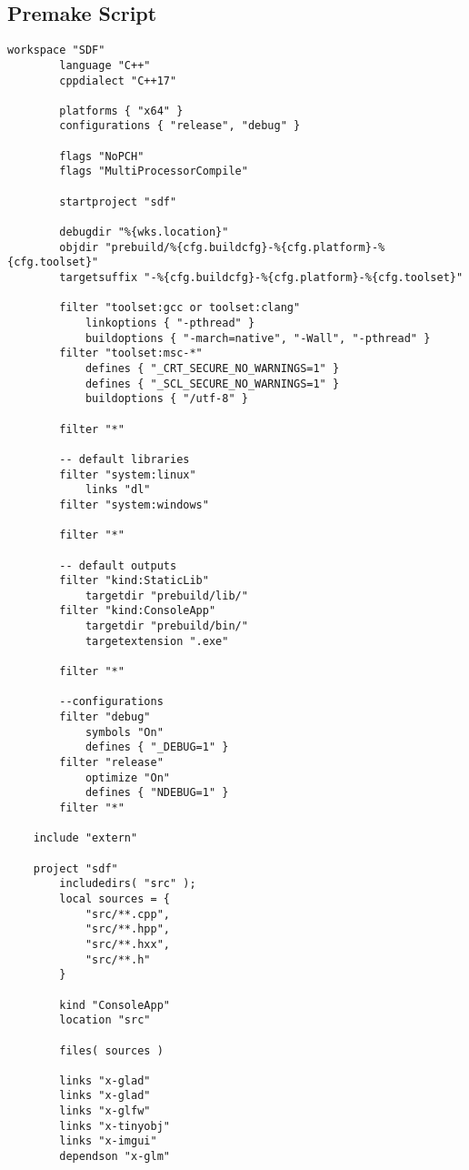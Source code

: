 \begin{appendices}
\chapter{Premake Script}
\label{ap:premake}
\begin{lstlisting}[caption = Premake Script for solution generation]
    workspace "SDF"
    	language "C++"
    	cppdialect "C++17"
    
    	platforms { "x64" }
    	configurations { "release", "debug" }
    
    	flags "NoPCH"
    	flags "MultiProcessorCompile"
    
    	startproject "sdf"
    
    	debugdir "%{wks.location}"
    	objdir "prebuild/%{cfg.buildcfg}-%{cfg.platform}-%{cfg.toolset}"
    	targetsuffix "-%{cfg.buildcfg}-%{cfg.platform}-%{cfg.toolset}"
    
    	filter "toolset:gcc or toolset:clang"
    		linkoptions { "-pthread" }
    		buildoptions { "-march=native", "-Wall", "-pthread" }
    	filter "toolset:msc-*"
    		defines { "_CRT_SECURE_NO_WARNINGS=1" }
    		defines { "_SCL_SECURE_NO_WARNINGS=1" }
    		buildoptions { "/utf-8" }
    		
    	filter "*"
    
    	-- default libraries
    	filter "system:linux"
    		links "dl"
    	filter "system:windows"
    	
    	filter "*"
    
    	-- default outputs
    	filter "kind:StaticLib"
    		targetdir "prebuild/lib/"
    	filter "kind:ConsoleApp"
    		targetdir "prebuild/bin/"
    		targetextension ".exe"
    		
    	filter "*"
    
    	--configurations
    	filter "debug"
    		symbols "On"
    		defines { "_DEBUG=1" }
    	filter "release"
    		optimize "On"
    		defines { "NDEBUG=1" }
    	filter "*"
    
    include "extern" 
    
    project "sdf"
    	includedirs( "src" );
    	local sources = { 
    		"src/**.cpp",
    		"src/**.hpp",
    		"src/**.hxx",
    		"src/**.h"
    	}
    
    	kind "ConsoleApp"
    	location "src"
    
    	files( sources )
    
    	links "x-glad"
    	links "x-glad"
    	links "x-glfw"
    	links "x-tinyobj"
    	links "x-imgui"
    	dependson "x-glm" 
    

\end{lstlisting}
\end{appendices}
